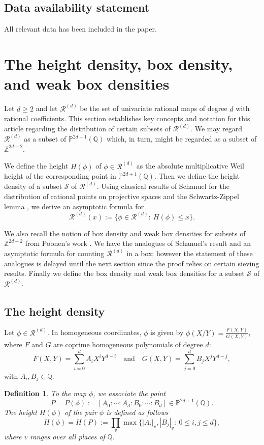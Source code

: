\documentclass[12pt]{amsart}
\newtheorem{definition}[theorem]{Definition}
\newcommand{\Z}{\mathbb{Z}}
\newcommand{\Q}{\mathbb{Q}}
\newcommand{\cR}{\mathcal{R}}
\numberwithin{equation}{section}
\begin{document}
\subsection*{Data availability statement} All relevant data has been included in the paper.

\section{The height density, box density, and weak box densities}
Let $d\geq 2$ and let $\cR^{(d)}$ be the set of univariate rational maps of degree $d$ with rational coefficients. This section establishes key concepts and notation for this article regarding the distribution of certain subsets of $\cR^{(d)}$. 
We may regard $\cR^{(d)}$ as a subset of $\mathbb{P}^{2d+1}(\Q)$ which, in turn, might be regarded as a subset of $\Z^{2d+2}$.

We define the height $H(\phi)$ of $\phi\in\cR^{(d)}$ as the absolute multiplicative Weil height of the corresponding point in $\mathbb{P}^{2d+1}(\Q)$. 
Then we define the height density of a subset $\mathcal{S}$ of $\cR^{(d)}$. 
Using classical results of Schanuel \cite{schanuel} for the distribution of rational points on projective spaces and the Schwartz-Zippel lemma \cite{Schwartz,Zippel}, we derive an asymptotic formula for 
$$\cR^{(d)}(x):=\{\phi\in\cR^{(d)}:\ H(\phi)\leq x\}.$$

We also recall the notion of box density and weak box densities for subsets of 
$\Z^{2d+2}$ 
from Poonen's work \cite{Poonensquarefree}. We have the analogues of
Schanuel's result and an asymptotic formula for counting $\cR^{(d)}$ in a box; however the statement of these analogues is delayed until the next section since the proof relies on certain sieving results. Finally we define
the box density and weak box densities for a subset $\mathcal{S}$ of $\cR^{(d)}$.
 
\subsection{The height density}
Let $\phi\in\cR^{(d)}$. In homogeneous coordinates, $\phi$ is given by $\phi(X/Y) = \frac{F(X, Y)}{G(X, Y)}$, where $F$ and $G$ are coprime homogeneous polynomials of degree $d$:
\[ F(X, Y) = \sum_{i=0}^d A_i X^i Y^{d-i} \quad \text{and} \quad G(X, Y) = \sum_{j=0}^d B_j X^j Y^{d-j}, \]
with $A_i, B_j \in \mathbb{Q}$.
\begin{definition}
    To the map $\phi$, we associate the point 
    \[ P=P(\phi) := [A_0 : \cdots : A_d : B_0 : \cdots : B_d] \in \mathbb{P}^{2d+1}(\mathbb{Q}). \]
     The \emph{height} $H(\phi)$ of the pair $\phi$ is defined as follows
    \begin{equation}\label{height of phi}
    H(\phi)=H(P):= \prod_v \max\{|A_i|_v, |B_j|_v:\ 0 \leq i, j \leq d\}, 
    \end{equation}
    where $v$ ranges over all places of $\mathbb{Q}$.
\end{definition}
\end{document}

